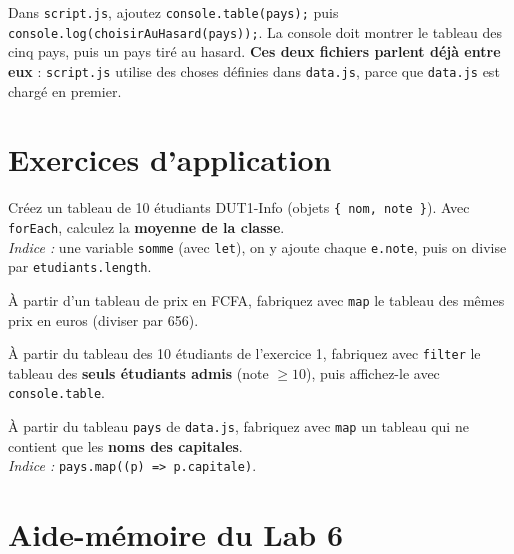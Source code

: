 \documentclass[11pt,a4paper]{article}
\newcommand{\code}[1]{\texttt{#1}}
\begin{document}
\begin{infobox}[Vérification]
Dans \code{script.js}, ajoutez \code{console.table(pays);} puis \code{console.log(choisirAuHasard(pays));}. La console doit montrer le tableau des cinq pays, puis un pays tiré au hasard. \textbf{Ces deux fichiers parlent déjà entre eux} : \code{script.js} utilise des choses définies dans \code{data.js}, parce que \code{data.js} est chargé en premier.
\end{infobox}

\section{Exercices d'application}

\begin{objectifbox}
Créez un tableau de 10 étudiants DUT1-Info (objets \code{\{ nom, note \}}). Avec \code{forEach}, calculez la \textbf{moyenne de la classe}.\\
\emph{Indice :} une variable \code{somme} (avec \code{let}), on y ajoute chaque \code{e.note}, puis on divise par \code{etudiants.length}.
\end{objectifbox}

\begin{objectifbox}
À partir d'un tableau de prix en FCFA, fabriquez avec \code{map} le tableau des mêmes prix en euros (diviser par 656).
\end{objectifbox}

\begin{objectifbox}
À partir du tableau des 10 étudiants de l'exercice 1, fabriquez avec \code{filter} le tableau des \textbf{seuls étudiants admis} (note $\geq 10$), puis affichez-le avec \code{console.table}.
\end{objectifbox}

\begin{objectifbox}
À partir du tableau \code{pays} de \code{data.js}, fabriquez avec \code{map} un tableau qui ne contient que les \textbf{noms des capitales}.\\
\emph{Indice :} \code{pays.map((p) => p.capitale)}.
\end{objectifbox}

\section{Aide-mémoire du Lab 6}
\end{document}
